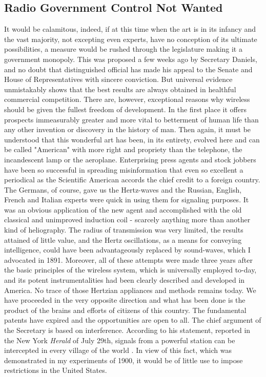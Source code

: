 \documentclass[a4paper,12pt,english,twoside,openright]{memoir}
\begin{document}
\subsection{Radio Government Control Not Wanted}
It would be calamitous, indeed, if at this time when the art is in its infancy and the vast majority, 
not excepting even experts, have no conception of its ultimate possibilities, a measure would be 
rushed through the legislature making it a government monopoly.  This was proposed a few 
weeks ago by Secretary Daniels, and no doubt that distinguished official has made his appeal to 
the Senate and House of Representatives with sincere conviction.  But universal evidence 
unmistakably shows that the best results are always obtained in healthful commercial 
competition.  There are, however, exceptional reasons why wireless should be given the fullest 
freedom of development.  In the first place it offers prospects immeasurably greater and more 
vital to betterment of human life than any other invention or discovery in the history of man.  Then 
again, it must be understood that this wonderful art has been, in its entirety, evolved here and can 
be called "American" with more right and propriety than the telephone, the incandescent lamp or 
the aeroplane.  Enterprising press agents and stock jobbers have been so successful in 
spreading misinformation that even so excellent a periodical as the Scientific American accords 
the chief credit to a foreign country.  The Germans, of course, gave us the Hertz-waves and the 
Russian, English, French and Italian experts were quick in using them for signaling purposes.  It 
was an obvious application of the new agent and accomplished with the old classical and 
unimproved induction coil - scarcely anything more than another kind of heliography.  The radius 
of transmission was very limited, the results attained of little value, and the Hertz oscillations, as a 
means for conveying intelligence, could have been advantageously replaced by sound-waves, 
which I advocated in 1891.  Moreover, all of these attempts were made three years after the basic 
principles of the wireless system, which is universally employed to-day, and its potent 
instrumentalities had been clearly described and developed in America.  No trace of those 
Hertzian appliances and methods remains today.  We have proceeded in the very opposite 
direction and what has been done is the product of the brains and efforts of citizens of this 
country.  The fundamental patents have expired and the opportunities are open to all.  The chief 
argument of the Secretary is based on interference.  According to his statement, reported in the 
New York \emph{Herald} of July 29th, signals from a powerful station can be intercepted in every village 
of the world .  In view of this fact, which was demonstrated in my experiments of 1900, it would be 
of little use to impose restrictions in the United States.  
\end{document}

